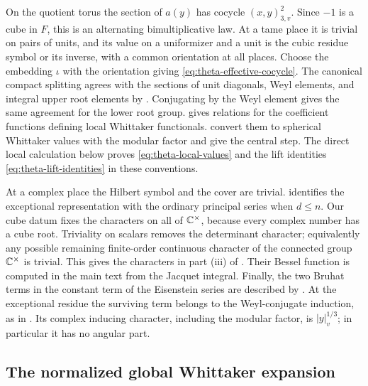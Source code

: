 On the quotient torus the section of \(a(y)\) has cocycle
\((x,y)_{3,v}^{2}\).  Since \(-1\) is a cube in \(F\), this is an alternating
bimultiplicative law.  At a tame place it is trivial on pairs of units, and
its value on a uniformizer and a unit is the cubic residue symbol or its
inverse, with a common orientation at all places.  Choose the embedding
\(\iota\) with the orientation giving \eqref{eq:theta-effective-cocycle}.
The canonical compact splitting agrees with the sections of unit diagonals,
Weyl elements, and integral upper root elements by
\cite[Proposition~0.1.3, p.~44]{KP84}.  Conjugating by the Weyl element gives
the same agreement for the lower root group.
\cite[Corollary~I.3.4, p.~78]{KP84} gives relations for the coefficient
functions defining local Whittaker functionals.
\cite[Theorems~I.4.2--I.4.3, p.~87]{KP84} convert them to spherical
Whittaker values with the modular factor and give the central step.
The direct local calculation below proves
\eqref{eq:theta-local-values} and the lift identities
\eqref{eq:theta-lift-identities} in these conventions.

At a complex place the Hilbert symbol and the cover are trivial.
\cite[Theorem~I.6.4(c), p.~104]{KP84} identifies the exceptional
representation with the ordinary principal series when \(d\le n\).
Our cube datum fixes the characters on all of \(\mathbb{C}^\times\), because every
complex number has a cube root.  Triviality on scalars removes the determinant
character; equivalently any possible remaining finite-order continuous
character of the connected group \(\mathbb{C}^\times\) is trivial.  This gives the
characters in part \textup{(iii)} of .  Their Bessel
function is computed in the main text from the Jacquet integral.  Finally,
the two Bruhat terms in the constant term of the Eisenstein series are
described by \cite[Proposition~II.1.2, p.~110]{KP84}.  At the exceptional
residue the surviving term belongs to the Weyl-conjugate induction, as in
\cite[Section~II.1, p.~114]{KP84}.  Its complex inducing character,
including the modular factor, is \(|y|_v^{1/3}\); in particular it has no
angular part.

\subsection{The normalized global Whittaker expansion}
\label{subsec:theta-global-normalization}

